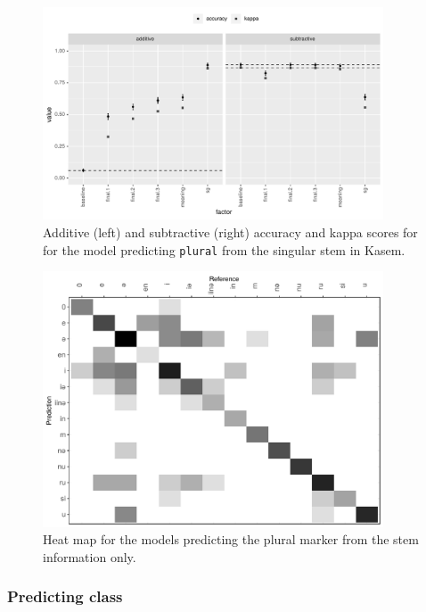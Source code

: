 \begin{figure}[!htpb]
  \centering
  \includegraphics[width=0.9\textwidth]{./figures/kasem/p-fi-plmark-sg-overall.pdf}
  \caption{Additive (left) and subtractive (right) accuracy and kappa scores for for the model predicting \texttt{plural} from the singular stem in Kasem.}\label{fig:overall-fi-plural-sg}
\end{figure}

\begin{figure}[!htpb]
  \centering
  \includegraphics[width=0.9\textwidth]{./figures/kasem/p-plural-sg-cm.pdf}
  \caption{Heat map for the models predicting the plural marker from the stem information only.}\label{fig:cm-plural}
\end{figure}


\subsubsection{Predicting class}

